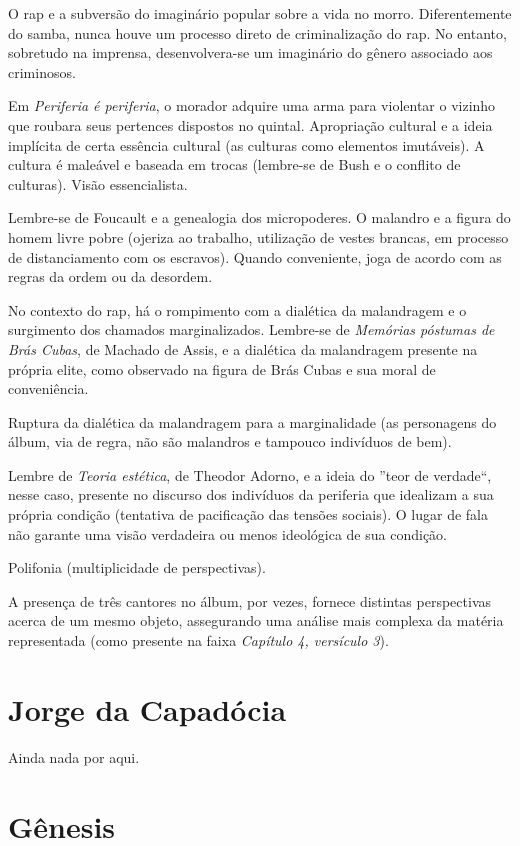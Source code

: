 O rap e a subversão do imaginário popular sobre a vida no morro. Diferentemente do samba, nunca houve um processo direto de criminalização do rap. No entanto, sobretudo na imprensa, desenvolvera-se um imaginário do gênero associado aos criminosos.

Em \textit{Periferia é periferia}, o morador adquire uma arma para violentar o vizinho que roubara seus pertences dispostos no quintal. Apropriação cultural e a ideia implícita de certa essência cultural (as culturas como elementos imutáveis). A cultura é maleável e baseada em trocas (lembre-se de Bush e o conflito de culturas). Visão essencialista.

Lembre-se de Foucault e a genealogia dos micropoderes.
O malandro e a figura do homem livre pobre (ojeriza ao trabalho, utilização de vestes brancas, em processo de distanciamento com os escravos). Quando conveniente, joga de acordo com as regras da ordem ou da desordem.

No contexto do rap, há o rompimento com a dialética da malandragem e o surgimento dos chamados marginalizados. Lembre-se de \textit{Memórias póstumas de Brás Cubas}, de Machado de Assis, e a dialética da malandragem presente na própria elite, como observado na figura de Brás Cubas e sua moral de conveniência.

Ruptura da dialética da malandragem para a marginalidade (as personagens do álbum, via de regra, não são malandros e tampouco indivíduos de bem).

Lembre de \textit{Teoria estética}, de Theodor Adorno, e a ideia do ''teor de verdade``, nesse caso, presente no discurso dos indivíduos da periferia que idealizam a sua própria condição (tentativa de pacificação das tensões sociais). O lugar de fala não garante uma visão verdadeira ou menos ideológica de sua condição.

Polifonia (multiplicidade de perspectivas).

A presença de três cantores no álbum, por vezes, fornece distintas perspectivas acerca de um mesmo objeto, assegurando uma análise mais complexa da matéria representada (como presente na faixa \textit{Capítulo 4, versículo 3}).

\section{Jorge da Capadócia}

Ainda nada por aqui.
			
\section{Gênesis}

